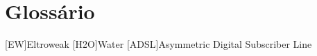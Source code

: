 \chapter{Glossário}

\footnotesize
\SingleSpacing


\begin{acronym}[]

    [EW]{Eltroweak}
	[H2O]{Water}
	[ADSL]{Asymmetric Digital Subscriber Line}

\end{acronym}


